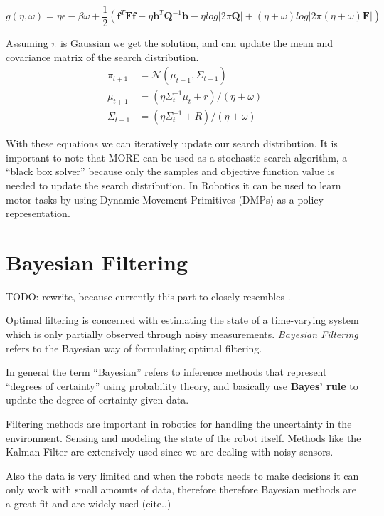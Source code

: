 $$ g(\eta, \omega) = \eta \epsilon - \beta \omega
+ \frac{1}{2} \left(\mathbf{f}^T \mathbf{F} \mathbf{f} - \eta \mathbf{b}^T \mathbf{Q}^{-1}
\mathbf{b} - \eta log |2\pi \mathbf{Q}| + (\eta + \omega) log |2\pi (\eta + \omega)
\mathbf{F}| \right) $$

Assuming $\pi$ is Gaussian we get the solution, and can update the mean and covariance matrix
of the search distribution. 
\begin{align} \label{policy_update}
  \pi_{t+1} &= \mathcal{N}(\mu_{t+1}, \Sigma_{t+1}) \\
  \mu_{t+1} &= (\eta \Sigma_{t}^{-1}\mu_t + r) / (\eta + \omega) \\
  \Sigma_{t+1} &= (\eta \Sigma_t^{-1} + R) / (\eta + \omega)
\end{align}

With these equations we can iteratively update our search distribution.
It is important to note that MORE can be used as a stochastic search algorithm,
a ``black box solver'' because only the samples and objective function value
is needed to update the search distribution.
In Robotics it can be used to learn motor tasks by using Dynamic Movement Primitives
(DMPs) as a policy representation.

\section{Bayesian Filtering}

TODO:  rewrite, because currently this part to closely resembles \citet{sarkka2013bayesian}.

Optimal filtering is concerned with estimating the state of a time-varying system
which is only partially observed through noisy measurements.
\textit{Bayesian Filtering} refers to the Bayesian way of formulating optimal
filtering.

In general the term ``Bayesian'' refers to inference methods that represent
``degrees of certainty'' using probability theory, and basically use \textbf{Bayes' rule}
to update the degree of certainty given data.

Filtering methods are important in robotics for handling the uncertainty in the
environment. Sensing and modeling the state of the robot itself.
Methods like the Kalman Filter are extensively used since we are dealing with noisy sensors.

Also the data is very limited and when the robots needs to make
decisions it can only work with small amounts of data, therefore
therefore Bayesian methods are a great fit and are widely used (cite..)

